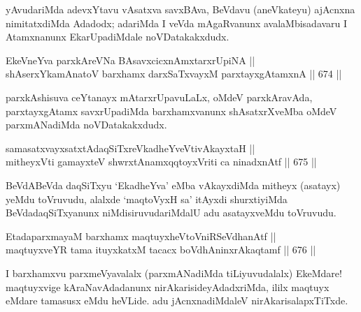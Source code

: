 \begin{artha} 
yAvudariMda adevxYtavu vAsatxva savxBAva, BeVdavu (aneVkateyu) 
ajAcnxna nimitatxdiMda Adadodx; adariMda I veVda mAgaRvanunx 
avalaMbisadavaru I Atamxnanunx EkarUpadiMdale noVDatakakxdudx.
\end{artha}

\begin{shl}
EkeVneYva parxkAreVNa BAsavxcicxnAmxtarxrUpiNA || \\
shAserxYkamAnatoV barxhamx darxSaTxvayxM parxtayxgAtamxnA ||  674 ||  
\end{shl}

\begin{artha} 
parxkAshisuva ceYtanayx mAtarxrUpavuLaLx, oMdeV parxkAravAda, 
parxtayxgAtamx savxrUpadiMda barxhamxvanunx shAsatxrXveMba oMdeV 
parxmANadiMda noVDatakakxdudx.
\end{artha}


\begin{shl}
samasatxvayxsatxtAdaqSiTxreVkadheYveVtivAkayxtaH || \\
mitheyxVti gamayxteV shwrxtAnamxqqtoyxVriti ca ninadxnAtf ||  675 ||  
\end{shl}

\begin{artha} 
BeVdABeVda daqSiTxyu `EkadheYva' eMba vAkayxdiMda mitheyx (asatayx) 
yeMdu toVruvudu, alalxde `maqtoVyxH sa' itAyxdi shurxtiyiMda 
BeVdadaqSiTxyanunx niMdisiruvudariMdalU adu asatayxveMdu toVruvudu.
\end{artha}


\begin{shl}
EtadaparxmayaM barxhamx maqtuyxheVtoVniRSeVdhanAtf || \\
maqtuyxveYR tama ituyxkatxM tacacx boVdhAninxrAkaqtamf ||  676 ||  
\end{shl}

\begin{artha} 
I barxhamxvu parxmeVyavalalx (parxmANadiMda tiLiyuvudalalx) EkeMdare! maqtuyxvige kAraNavAdadanunx nirAkarisideyAdadxriMda, ililx maqtuyx eMdare tamasusx eMdu heVLide. adu jAcnxnadiMdaleV nirAkarisalapxTiTxde.
\end{artha}


